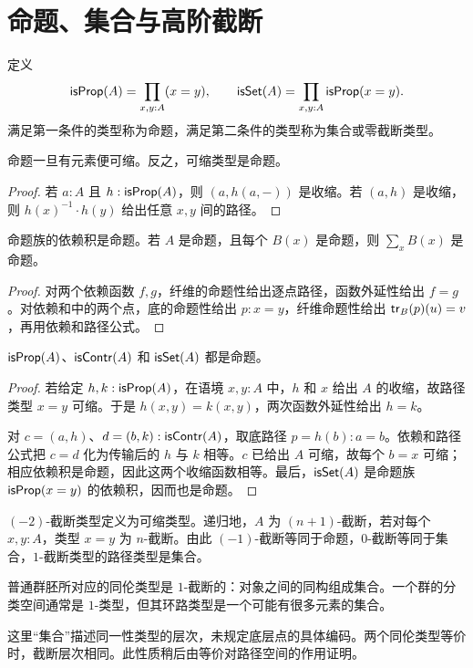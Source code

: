 \section{命题、集合与高阶截断}
\begin{definition}[命题与集合]
定义
\[
\mathsf{isProp}(A)=\prod_{x,y:A}(x=y),
\qquad
\mathsf{isSet}(A)=\prod_{x,y:A}\mathsf{isProp}(x=y).
\]
满足第一条件的类型称为命题，满足第二条件的类型称为集合或零截断类型。
\end{definition}
\begin{lemma}
命题一旦有元素便可缩。反之，可缩类型是命题。
\end{lemma}
\begin{proof}
若 $a:A$ 且 $h:\mathsf{isProp}(A)$，则 $(a,h(a,-))$ 是收缩。若 $(a,h)$ 是收缩，则 $h(x)^{-1}\cdot h(y)$ 给出任意 $x,y$ 间的路径。
\end{proof}
\begin{proposition}[命题的封闭性]
命题族的依赖积是命题。若 $A$ 是命题，且每个 $B(x)$ 是命题，则 $\sum_xB(x)$ 是命题。
\end{proposition}
\begin{proof}
对两个依赖函数 $f,g$，纤维的命题性给出逐点路径，函数外延性给出 $f=g$。对依赖和中的两个点，底的命题性给出 $p:x=y$，纤维命题性给出 $\mathsf{tr}_B(p)(u)=v$，再用依赖和路径公式。
\end{proof}
\begin{proposition}[性质的证明无关性]
$\mathsf{isProp}(A)$、$\mathsf{isContr}(A)$ 和 $\mathsf{isSet}(A)$ 都是命题。
\end{proposition}
\begin{proof}
若给定 $h,k:\mathsf{isProp}(A)$，在语境 $x,y:A$ 中，$h$ 和 $x$ 给出 $A$ 的收缩，故路径类型 $x=y$ 可缩。于是 $h(x,y)=k(x,y)$，两次函数外延性给出 $h=k$。

对 $c=(a,h)$、$d=(b,k):\mathsf{isContr}(A)$，取底路径 $p=h(b):a=b$。依赖和路径公式把 $c=d$ 化为传输后的 $h$ 与 $k$ 相等。$c$ 已给出 $A$ 可缩，故每个 $b=x$ 可缩；相应依赖积是命题，因此这两个收缩函数相等。最后，$\mathsf{isSet}(A)$ 是命题族 $\mathsf{isProp}(x=y)$ 的依赖积，因而也是命题。
\end{proof}
\begin{definition}[截断层次]
$(-2)$-截断类型定义为可缩类型。递归地，$A$ 为 $(n+1)$-截断，若对每个 $x,y:A$，类型 $x=y$ 为 $n$-截断。由此 $(-1)$-截断等同于命题，$0$-截断等同于集合，$1$-截断类型的路径类型是集合。
\end{definition}
\begin{example}
普通群胚所对应的同伦类型是 $1$-截断的：对象之间的同构组成集合。一个群的分类空间通常是 $1$-类型，但其环路类型是一个可能有很多元素的集合。
\end{example}
\begin{remark}
这里“集合”描述同一性类型的层次，未规定底层点的具体编码。两个同伦类型等价时，截断层次相同。此性质稍后由等价对路径空间的作用证明。
\end{remark}

